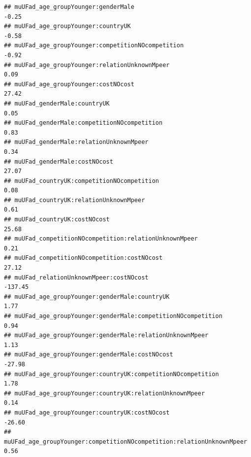 \documentclass[
]{article}
\begin{document}
\begin{verbatim}
## muUFad_age_groupYounger:genderMale                                                                        -0.25
## muUFad_age_groupYounger:countryUK                                                                         -0.58
## muUFad_age_groupYounger:competitionNOcompetition                                                          -0.92
## muUFad_age_groupYounger:relationUnknownMpeer                                                               0.09
## muUFad_age_groupYounger:costNOcost                                                                        27.42
## muUFad_genderMale:countryUK                                                                                0.05
## muUFad_genderMale:competitionNOcompetition                                                                 0.83
## muUFad_genderMale:relationUnknownMpeer                                                                     0.34
## muUFad_genderMale:costNOcost                                                                              27.07
## muUFad_countryUK:competitionNOcompetition                                                                  0.08
## muUFad_countryUK:relationUnknownMpeer                                                                      0.61
## muUFad_countryUK:costNOcost                                                                               25.68
## muUFad_competitionNOcompetition:relationUnknownMpeer                                                       0.21
## muUFad_competitionNOcompetition:costNOcost                                                                27.12
## muUFad_relationUnknownMpeer:costNOcost                                                                  -137.45
## muUFad_age_groupYounger:genderMale:countryUK                                                               1.77
## muUFad_age_groupYounger:genderMale:competitionNOcompetition                                                0.94
## muUFad_age_groupYounger:genderMale:relationUnknownMpeer                                                    1.13
## muUFad_age_groupYounger:genderMale:costNOcost                                                            -27.98
## muUFad_age_groupYounger:countryUK:competitionNOcompetition                                                 1.78
## muUFad_age_groupYounger:countryUK:relationUnknownMpeer                                                     0.14
## muUFad_age_groupYounger:countryUK:costNOcost                                                             -26.60
## muUFad_age_groupYounger:competitionNOcompetition:relationUnknownMpeer                                      0.56

\end{verbatim}
\end{document}
